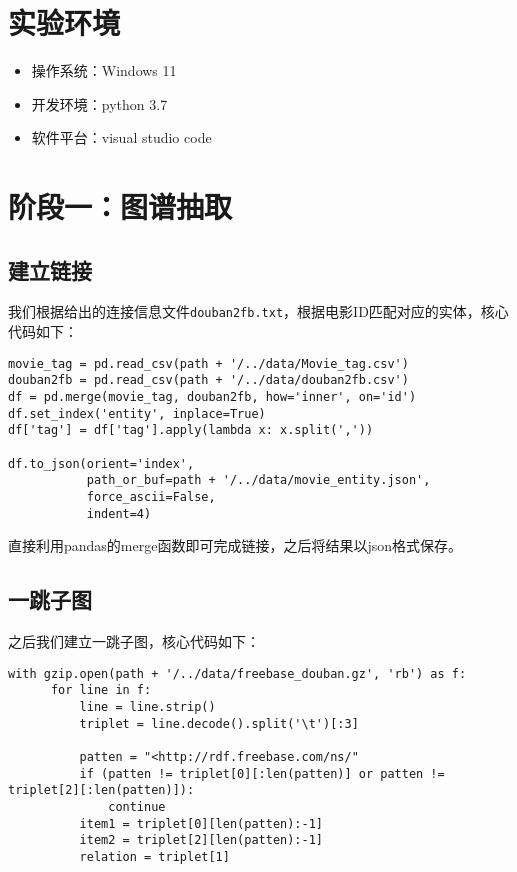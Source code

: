 \documentclass{ctexart}
\begin{document}
\begin{sloppypar}
    \section{实验环境}

    \begin{itemize}
        \item 操作系统：Windows 11
        \item 开发环境：python 3.7
        \item 软件平台：visual studio code
    \end{itemize}

    \section{阶段一：图谱抽取}
    \subsection{建立链接}
    我们根据给出的连接信息文件\texttt{douban2fb.txt}，根据电影ID匹配对应的实体，核心代码如下：

    \begin{lstlisting}[style=Python]
movie_tag = pd.read_csv(path + '/../data/Movie_tag.csv')
douban2fb = pd.read_csv(path + '/../data/douban2fb.csv')
df = pd.merge(movie_tag, douban2fb, how='inner', on='id')
df.set_index('entity', inplace=True)
df['tag'] = df['tag'].apply(lambda x: x.split(','))

df.to_json(orient='index',
           path_or_buf=path + '/../data/movie_entity.json',
           force_ascii=False,
           indent=4)
\end{lstlisting}

    直接利用pandas的merge函数即可完成链接，之后将结果以json格式保存。

    \subsection{一跳子图}
    之后我们建立一跳子图，核心代码如下：

    \begin{lstlisting}[style=Python]
with gzip.open(path + '/../data/freebase_douban.gz', 'rb') as f:
      for line in f:
          line = line.strip()
          triplet = line.decode().split('\t')[:3]
  
          patten = "<http://rdf.freebase.com/ns/"
          if (patten != triplet[0][:len(patten)] or patten != triplet[2][:len(patten)]):
              continue
          item1 = triplet[0][len(patten):-1]
          item2 = triplet[2][len(patten):-1]
          relation = triplet[1]
  

\end{lstlisting}
\end{sloppypar}
\end{document}
